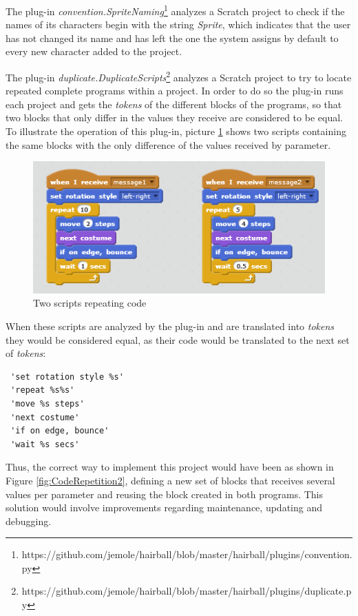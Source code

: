 \documentclass[conference]{format/IEEEtran}
\begin{document}
The plug-in \textit{convention.SpriteNaming}\footnote{https://github.com/jemole/hairball/blob/master/hairball/plugins/convention.py} analyzes a Scratch project to check if the names of its characters begin with the string \textit{Sprite}, which indicates that the user has not changed its name and has left the one the system assigns by default to every new character added to the project.

The plug-in \textit{duplicate.DuplicateScripts}\footnote{https://github.com/jemole/hairball/blob/master/hairball/plugins/duplicate.py} analyzes a Scratch project to try to locate repeated complete programs within a project. In order to do so the plug-in runs each project and gets the \textit{tokens} of the different blocks of the programs, so that two blocks that only differ in the values they receive are considered to be equal. To illustrate the operation of this plug-in, picture \ref{fig:CodeRepetition1} shows two scripts containing the same blocks with the only difference of the values received by parameter.
\begin{figure}
  \centering
    \includegraphics{img/CodeRepetition1.png}
  \caption{Two scripts repeating code}
  \label{fig:CodeRepetition1}
\end{figure}


When these scripts are analyzed by the plug-in and are translated into \textit{tokens} they would be considered equal, as their code would be translated to the next set of \textit{tokens}:
\begin{verbatim}
 'set rotation style %s'
 'repeat %s%s'
 'move %s steps'
 'next costume'
 'if on edge, bounce'
 'wait %s secs'
\end{verbatim}

Thus, the correct way to implement this project would have been as shown in Figure \ref{fig:CodeRepetition2}, defining a new set of blocks that receives several values per parameter and reusing the block created in both programs. This solution would involve improvements regarding maintenance, updating and debugging.
\end{document}

